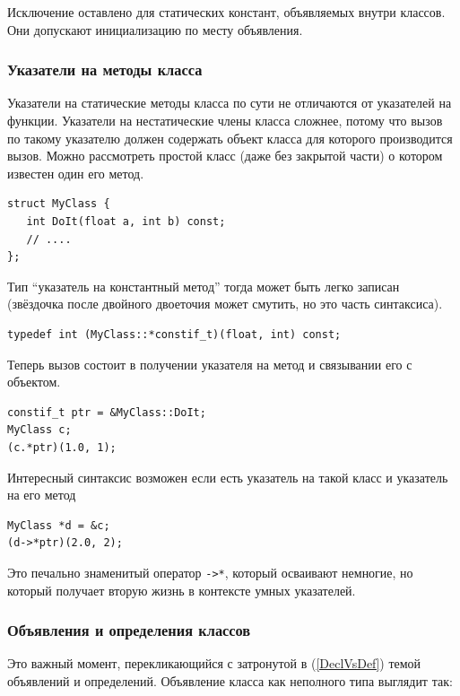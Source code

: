 \documentclass[a4paper,12pt,oneside]{article}
\begin{document}
Исключение оставлено для статических констант, объявляемых внутри классов. Они допускают инициализацию по месту объявления.

\subsubsection{Указатели на методы класса}

Указатели на статические методы класса по сути не отличаются от указателей на функции. Указатели на нестатические члены класса сложнее, потому что вызов по такому указателю должен содержать объект класса для которого производится вызов. Можно рассмотреть простой класс (даже без закрытой части) о котором известен один его метод.

\begin{lstlisting}
struct MyClass {
   int DoIt(float a, int b) const;
   // ....
};
\end{lstlisting}

Тип ``указатель на константный метод'' тогда может быть легко записан (звёздочка после двойного двоеточия может смутить, но это часть синтаксиса).

\begin{lstlisting}
typedef int (MyClass::*constif_t)(float, int) const; 
\end{lstlisting}

Теперь вызов состоит в получении указателя на метод и связывании его с объектом.

\begin{lstlisting}
constif_t ptr = &MyClass::DoIt;
MyClass c;
(c.*ptr)(1.0, 1);
\end{lstlisting}

Интересный синтаксис возможен если есть указатель на такой класс и указатель на его метод

\begin{lstlisting}
MyClass *d = &c;
(d->*ptr)(2.0, 2);
\end{lstlisting}

Это печально знаменитый оператор \lstinline!->*!, который осваивают немногие, но который получает вторую жизнь в контексте умных указателей.

\subsubsection{Объявления и определения классов}\label{DeclDefs}

Это важный момент, перекликающийся с затронутой в (\ref{DeclVsDef}) темой объявлений и определений. Объявление класса как неполного типа выглядит так:
\end{document}

